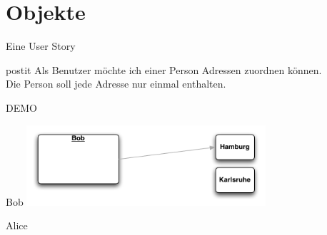 \part{Objekte}

\begin{frame}{Eine User Story}
\hbox{}\hfill\begin{beamercolorbox}[sep=1em,wd=7cm,shadow=true,rounded=true]{postit} 
Als Benutzer möchte ich einer Person Adressen zuordnen können.\\[1em]
Die Person soll jede Adresse nur einmal enthalten.
\end{beamercolorbox}\hfill\hbox{}
\end{frame}

\begin{frame}{}
\begin{center}
DEMO
\end{center}
\end{frame}



\begin{frame}[t]{Bob}
\includegraphics[height=3cm]{Bob1.pdf}

\end{frame}

\begin{frame}{Alice}

\end{frame}

